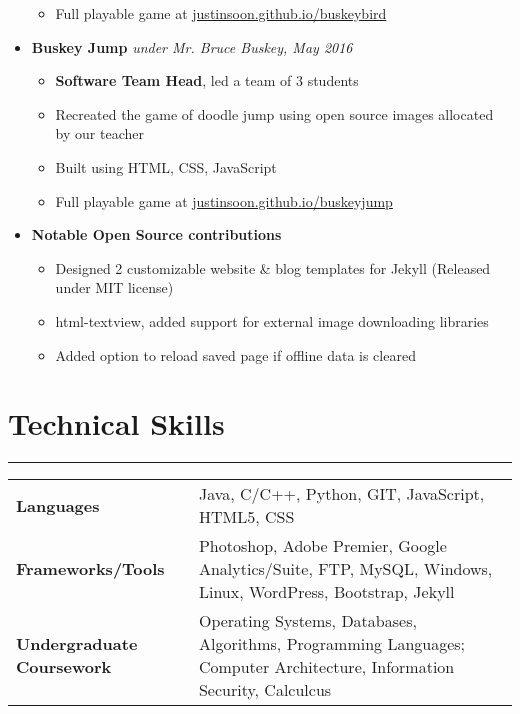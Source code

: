 \documentclass[a4paper]{article}
\begin{document}
\begin{itemize}
\begin{itemize}
		\item Full playable game at \href{http://justinsoon.github.io/BuskeyBird/}{justinsoon.github.io/buskeybird}
	      \end{itemize}
	\item
	      \textbf{Buskey Jump}
	      \hfill \textit{under Mr. Bruce Buskey, May 2016}
	      \begin{itemize}
		\vspace{-2mm} \setlength\itemsep{-0.7mm}
		\item \textbf{Software Team Head}, led a team of 3 students
		\item Recreated the game of doodle jump using open source images allocated by our teacher
		\item Built using HTML, CSS, JavaScript
		\item Full playable game at \href{https://justinsoon.github.io/buskeyjump/}{justinsoon.github.io/buskeyjump}
	      \end{itemize}
	\item
	      \textbf{Notable Open Source contributions}
	      \begin{itemize}
	      	\vspace{-2mm} \setlength\itemsep{-0.7mm}
	      	\item Designed 2 customizable website \& blog templates for Jekyll (Released under MIT license)
	      	\item html-textview, added support for external image downloading libraries
	      	\item Added option to reload saved page if offline data is cleared
	      \end{itemize}
\end{itemize}

\section*{Technical Skills}
\hrule
\vspace{3mm}
\begin{tabular}{@{}m{40mm}m{130mm}@{}}
	\textbf{\textrm{Languages}}        & Java, C/C++, Python, GIT, JavaScript, HTML5, CSS\\
	\textbf{\textrm{Frameworks/Tools}} & Photoshop, Adobe Premier, Google Analytics/Suite, FTP, MySQL, Windows, Linux, WordPress, Bootstrap, Jekyll\\
	\textbf{\textrm{Undergraduate Coursework}} & Operating Systems, Databases, Algorithms, Programming Languages; Computer Architecture, Information Security, Calculcus\\
\end{tabular}
\end{document}
